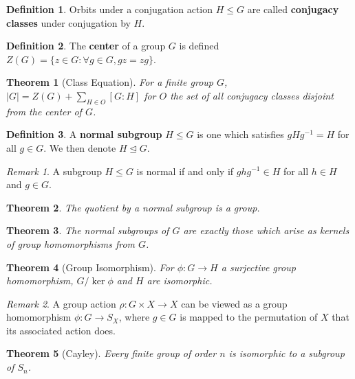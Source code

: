 \documentclass[
    parskip=half,
    toc=flat,
    toc=sectionentrydotfill,
]{scrartcl}  %
\theoremstyle{definition}
\newtheorem{definition}{Definition}[section]
\theoremstyle{plain}
\newtheorem{theorem}{Theorem}[section]
\theoremstyle{remark}
\newtheorem{remark}{Remark}[section]
\begin{document}
\begin{definition}
    Orbits under a conjugation action $H\leq G$ are called
    \textbf{conjugacy classes} under conjugation by $H$.
\end{definition}

\begin{definition}
    The \textbf{center} of a group $G$ is defined
    $Z(G)=\{z\in G:\forall g\in G, gz=zg\}$.
\end{definition}

\begin{theorem}[Class Equation]
    For a finite group $G$, $|G|=Z(G)+\sum_{H\in O}[G:H]$ for $O$ the set of
    all conjugacy classes disjoint from the center of $G$.
\end{theorem}

\begin{definition}
    A \textbf{normal subgroup} $H\leq G$ is one which satisfies $gHg^{-1}=H$
    for all $g\in G$.
    We then denote $H\trianglelefteq G$.
\end{definition}

\begin{remark}
    A subgroup $H\leq G$ is normal if and only if $ghg^{-1}\in H$ for all
    $h\in H$ and $g\in G$.
\end{remark}

\begin{theorem}
    The quotient by a normal subgroup is a group.
\end{theorem}

\begin{theorem}
    The normal subgroups of $G$ are exactly those which arise as kernels of
    group homomorphisms from $G$.
\end{theorem}

\begin{theorem}[Group Isomorphism]
    For $\phi:G\to H$ a surjective group homomorphism, $G/\ker\phi$ and $H$ are
    isomorphic.
\end{theorem}

\begin{remark}
    A group action $\rho:G\times X\to X$ can be viewed as a group homomorphism
    $\phi:G\to S_X$, where $g\in G$ is mapped to the permutation of $X$ that
    its associated action does.
\end{remark}

\begin{theorem}[Cayley]
    Every finite group of order $n$ is isomorphic to a subgroup of $S_n$.
\end{theorem}
\end{document}

